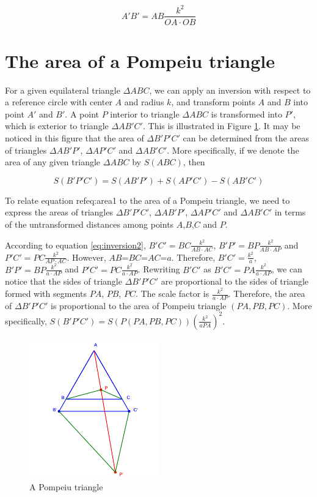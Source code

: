 \documentclass[12pt]{article}
\begin{document}
\begin{equation}
{A'B'}={AB}\frac{k^2}{OA\cdot OB}
\label{eq:inversion2}
\end{equation}

\section{The area of a Pompeiu triangle}

For a given equilateral triangle $\Delta ABC$, we can apply an inversion with respect to a reference circle with center $A$ and radius $k$, and transform points $A$ and $B$ into point $A'$ and $B'$. A point $P$ interior to triangle $\Delta ABC$ is transformed into $P'$, which is exterior to triangle $\Delta AB'C'$. This is illustrated in Figure \ref{fig:pompeiuTriangles1}. It may be noticed in this figure that the area of $\Delta B'P'C'$ can be determined from the areas of triangles $\Delta AB'P'$, $\Delta AP'C'$ and $\Delta AB'C'$.  More specifically, if we denote the area of any given triangle $\Delta ABC$ by $S(ABC)$, then

\begin{equation}
S(B'P'C')=S(AB'P')+S(AP'C')-S(AB'C')
\label{eq:area1}
\end{equation}

To relate equation ref{eq:area1} to the area of a Pompeiu triangle, we need to express the areas of triangles $\Delta B'P'C'$, $\Delta AB'P'$, $\Delta AP'C'$ and $\Delta AB'C'$ in terms of the untransformed distances among points $A$,$B$,$C$ and $P$.

According to equation \ref{eq:inversion2}, $B'C'=BC\frac{k^2}{AB\cdot AC}$, $B'P'=BP\frac{k^2}{AB\cdot AP}$ and $P'C'=PC\frac{k^2}{AP\cdot AC}$. 
However, $AB$=$BC$=$AC$=$a$. Therefore, $B'C'=\frac{k^2}{a}$, $B'P'=BP\frac{k^2}{a\cdot AP}$ and $P'C'=PC\frac{k^2}{a\cdot AP}$. Rewriting $B'C'$ as $B'C'=PA \frac{k^2}{a \cdot AP}$, we can notice that the sides of triangle $\Delta B'P'C'$ are proportional to the sides of triangle formed with segments $PA$, $PB$, $PC$. The scale factor is $\frac{k^2}{a \cdot AP}$. Therefore, the area of $\Delta B'P'C'$ is proportional to the area of Pompeiu triangle $(PA,PB,PC)$. More specifically, $S(B'P'C')=S(P(PA,PB,PC))(\frac{k^2}{a PA})^2$.

\begin{figure}[h]
\centering
\includegraphics[width=0.5\textwidth]{pompeiuTriangle.png}
\caption{A Pompeiu triangle}
\label{fig:pompeiuTriangles1}
\end{figure}
\end{document}
